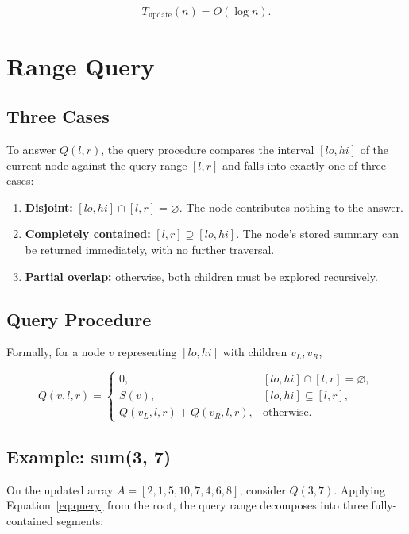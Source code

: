 \documentclass[11pt]{article}
\begin{document}
\begin{equation}
\boxed{T_{\text{update}}(n) = O(\log n)}.
\end{equation}

\section{Range Query}

\subsection{Three Cases}
To answer $Q(l,r)$, the query procedure compares the interval $[lo,hi]$ of the current node against the query range $[l,r]$ and falls into exactly one of three cases:

\begin{enumerate}[nosep]
  \item \textbf{Disjoint:} $[lo,hi] \cap [l,r] = \varnothing$. The node contributes nothing to the answer.
  \item \textbf{Completely contained:} $[l,r] \supseteq [lo,hi]$. The node's stored summary can be returned immediately, with no further traversal.
  \item \textbf{Partial overlap:} otherwise, both children must be explored recursively.
\end{enumerate}

\subsection{Query Procedure}
Formally, for a node $v$ representing $[lo,hi]$ with children $v_L, v_R$,

\begin{equation}
Q(v,l,r) =
\begin{cases}
0, & [lo,hi] \cap [l,r] = \varnothing, \\[4pt]
S(v), & [lo,hi] \subseteq [l,r], \\[4pt]
Q(v_L,l,r) + Q(v_R,l,r), & \text{otherwise.}
\end{cases}
\label{eq:query}
\end{equation}

\subsection{Example: sum(3, 7)}
On the updated array $A = [2,1,5,10,7,4,6,8]$, consider $Q(3,7)$. Applying Equation~\eqref{eq:query} from the root, the query range decomposes into three fully-contained segments:
\end{document}
